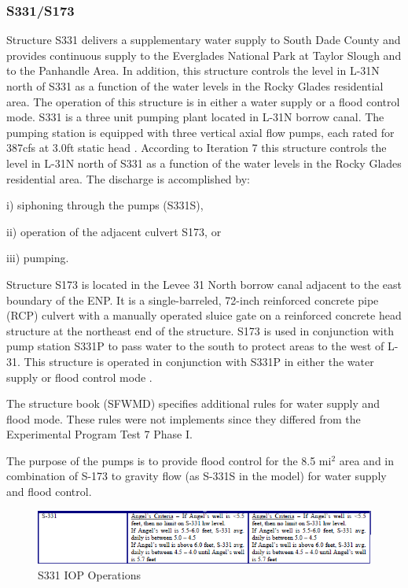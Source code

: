 \subsubsection{S331/S173}
Structure S331 delivers a supplementary water supply to South Dade County and provides continuous supply to the Everglades National Park at Taylor Slough and to the Panhandle Area. In addition, this structure controls the level in L-31N north of S331 as a function of the water levels in the Rocky Glades residential area. The operation of this structure is in either a water supply or a flood control mode. S331 is a three unit pumping plant located in L-31N borrow canal. The pumping station is equipped with three vertical axial flow pumps, each rated for 387cfs at 3.0ft static head \cite{SFWMD1994}. According to Iteration 7 this structure controls the level in L-31N north of S331 as a function of the water levels in the Rocky Glades residential area\cite{SFWMD1994}.  The discharge is accomplished by:

\begin{packed_items}
\item i) siphoning through the pumps (S331S),
\item ii) operation of the adjacent culvert S173, or
\item iii) pumping.
\end{packed_items}

Structure S173 is located in the Levee 31 North borrow canal adjacent to the east boundary of the ENP. It is a single-barreled, 72-inch reinforced concrete pipe (RCP) culvert with a manually operated sluice gate on a reinforced concrete head structure at the northeast end of the structure. S173 is used in conjunction with pump station S331P to pass water to the south to protect areas to the west of L-31. This structure is operated in conjunction with S331P in either the water supply or flood control mode .

The structure book (SFWMD) specifies additional rules for water supply and flood mode. These rules were not implements since they differed from the Experimental Program Test 7 Phase I.

The purpose of the pumps is to provide flood control for the 8.5 mi$^2$ area and in combination of S-173 to gravity flow (as S-331S in the model) for water supply and flood control.

\begin{figure}[!h]
  \begin{center}
  \includegraphics[width=6.5in]{../figs/S331_IOPops.png}
  \caption{S331 IOP Operations}
  \label{fig:S331iop}
  \end{center}
\end{figure}


